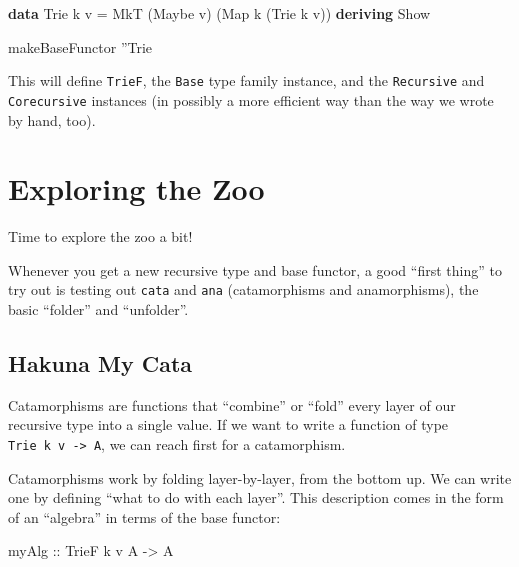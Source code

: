 \documentclass[]{article}
\newenvironment{Shaded}{}{}
\newcommand{\DataTypeTok}[1]{\textcolor[rgb]{0.56,0.13,0.00}{#1}}
\newcommand{\FunctionTok}[1]{\textcolor[rgb]{0.02,0.16,0.49}{#1}}
\newcommand{\KeywordTok}[1]{\textcolor[rgb]{0.00,0.44,0.13}{\textbf{#1}}}
\newcommand{\NormalTok}[1]{#1}
\newcommand{\OtherTok}[1]{\textcolor[rgb]{0.00,0.44,0.13}{#1}}
\begin{document}
\begin{Shaded}
\begin{Highlighting}[]
\KeywordTok{data} \DataTypeTok{Trie}\NormalTok{ k v }\FunctionTok{=} \DataTypeTok{MkT}\NormalTok{ (}\DataTypeTok{Maybe}\NormalTok{ v) (}\DataTypeTok{Map}\NormalTok{   k (}\DataTypeTok{Trie}\NormalTok{ k v))}
  \KeywordTok{deriving} \DataTypeTok{Show}

\NormalTok{makeBaseFunctor ''}\DataTypeTok{Trie}
\end{Highlighting}
\end{Shaded}

This will define \texttt{TrieF}, the \texttt{Base} type family instance, and the
\texttt{Recursive} and \texttt{Corecursive} instances (in possibly a more
efficient way than the way we wrote by hand, too).

\hypertarget{exploring-the-zoo}{%
\section{Exploring the Zoo}\label{exploring-the-zoo}}

Time to explore the zoo a bit!

Whenever you get a new recursive type and base functor, a good ``first thing''
to try out is testing out \texttt{cata} and \texttt{ana} (catamorphisms and
anamorphisms), the basic ``folder'' and ``unfolder''.

\hypertarget{hakuna-my-cata}{%
\subsection{Hakuna My Cata}\label{hakuna-my-cata}}

Catamorphisms are functions that ``combine'' or ``fold'' every layer of our
recursive type into a single value. If we want to write a function of type
\texttt{Trie\ k\ v\ -\textgreater{}\ A}, we can reach first for a catamorphism.

Catamorphisms work by folding layer-by-layer, from the bottom up. We can write
one by defining ``what to do with each layer''. This description comes in the
form of an ``algebra'' in terms of the base functor:

\begin{Shaded}
\begin{Highlighting}[]
\OtherTok{myAlg ::} \DataTypeTok{TrieF}\NormalTok{ k v }\DataTypeTok{A} \OtherTok{->} \DataTypeTok{A}
\end{Highlighting}
\end{Shaded}
\end{document}
